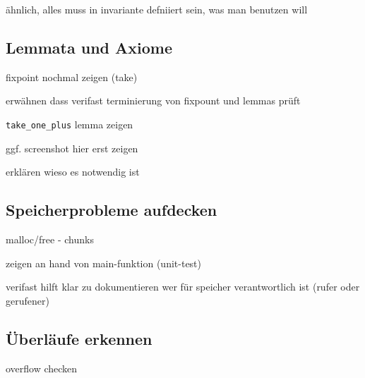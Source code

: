 ähnlich, alles muss in invariante defniiert sein, was man benutzen will

\subsection{Lemmata und Axiome}

fixpoint nochmal zeigen (take)

erwähnen dass verifast terminierung von fixpount und lemmas prüft

\lstinline{take_one_plus} lemma zeigen

ggf. screenshot hier erst zeigen

erklären wieso es notwendig ist

\subsection{Speicherprobleme aufdecken}

malloc/free - chunks

zeigen an hand von main-funktion (unit-test)

verifast hilft klar zu dokumentieren wer für speicher verantwortlich ist (rufer oder gerufener)

\subsection{Überläufe erkennen}

overflow checken
